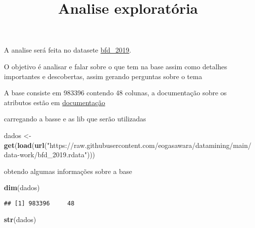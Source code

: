 \documentclass[
]{article}
\title{Analise exploratória}
\author{}
\date{\vspace{-2.5em}}
\newenvironment{Shaded}{\begin{snugshade}}{\end{snugshade}}
\newcommand{\FunctionTok}[1]{\textcolor[rgb]{0.13,0.29,0.53}{\textbf{#1}}}
\newcommand{\NormalTok}[1]{#1}
\newcommand{\OtherTok}[1]{\textcolor[rgb]{0.56,0.35,0.01}{#1}}
\newcommand{\StringTok}[1]{\textcolor[rgb]{0.31,0.60,0.02}{#1}}
\begin{document}
\maketitle

A analise será feita no datasete
\href{\%22https://raw.githubusercontent.com/eogasawara/datamining/main/data-work/bfd_2019.rdata\%22}{bfd\_2019}.

O objetivo é analisar e falar sobre o que tem na base assim como
detalhes importantes e descobertas, assim gerando perguntas sobre o tema

A base consiste em 983396 contendo 48 colunas, a documentação sobre os
atributos estão em \href{https://osf.io/8eh3p/}{documentação}

carregando a basse e as lib que serão utilizadas

\begin{Shaded}
\begin{Highlighting}[]
\NormalTok{dados }\OtherTok{\textless{}{-}} \FunctionTok{get}\NormalTok{(}\FunctionTok{load}\NormalTok{(}\FunctionTok{url}\NormalTok{(}\StringTok{"https://raw.githubusercontent.com/eogasawara/datamining/main/data{-}work/bfd\_2019.rdata"}\NormalTok{)))}
\end{Highlighting}
\end{Shaded}

obtendo algumas informações sobre a base

\begin{Shaded}
\begin{Highlighting}[]
\FunctionTok{dim}\NormalTok{(dados)}
\end{Highlighting}
\end{Shaded}

\begin{verbatim}
## [1] 983396     48
\end{verbatim}

\begin{Shaded}
\begin{Highlighting}[]
\FunctionTok{str}\NormalTok{(dados)}
\end{Highlighting}
\end{Shaded}
\end{document}
